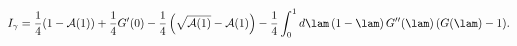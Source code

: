 \begin{equation}
I_\gamma=
\frac{1}{4}(1- {\cal A}(1)) +\frac{1}{4} G'(0) 
- \frac{1}{4}\left(\sqrt{{\cal A}(1)}-{\cal A}(1)\right)
- \frac{1}{4}\int_0^1 d\lam\,(1-\lam)\,G''(\lam)\,(G(\lam)-1). 
\label{eq:Ifinal}\end{equation}


